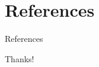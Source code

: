 \documentclass[10pt]{beamer}
\begin{document}
\section*{References}
\begin{frame}{References}
    \footnotesize
    \nocite{*}
    
    
\end{frame}








\begin{frame}
    \begin{center}
        {\Huge\calligra Thanks!}
    \end{center}
\end{frame}
\end{document}
